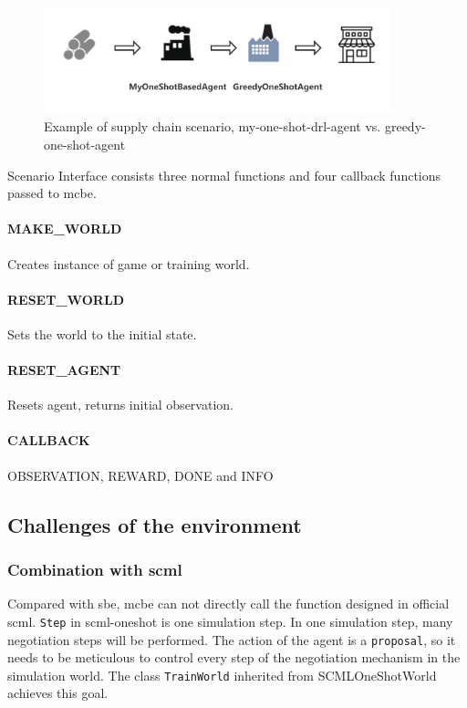 \begin{figure}[htbp]
\centering
\includegraphics[width=0.9\textwidth]{./images/supply-chain-scenario-1.png}
\caption{Example of supply chain scenario, \gls{my-one-shot-drl-agent} vs. \gls{greedy-one-shot-agent}}
\label{fig:supply-chain-scenario-1}
\end{figure}

Scenario Interface consists three normal functions and four callback functions passed to \gls{mcbe}.

\paragraph{MAKE\_WORLD} Creates instance of game or training world.
\paragraph{RESET\_WORLD} Sets the world to the initial state.
\paragraph{RESET\_AGENT} Resets agent, returns initial observation.
\paragraph{CALLBACK} OBSERVATION, REWARD, DONE and INFO

\subsection{Challenges of the environment}
\subsubsection{Combination with \gls{scml}}
Compared with \gls{sbe}, \gls{mcbe} can not directly call the function designed in official \gls{scml}. \texttt{Step} in \gls{scml-oneshot} is one simulation step. In one simulation step, many negotiation steps will be performed. The action of the agent is a \texttt{proposal}, so it needs to be meticulous to control every step of the negotiation mechanism in the simulation world. The class \texttt{TrainWorld} inherited from SCMLOneShotWorld achieves this goal.
